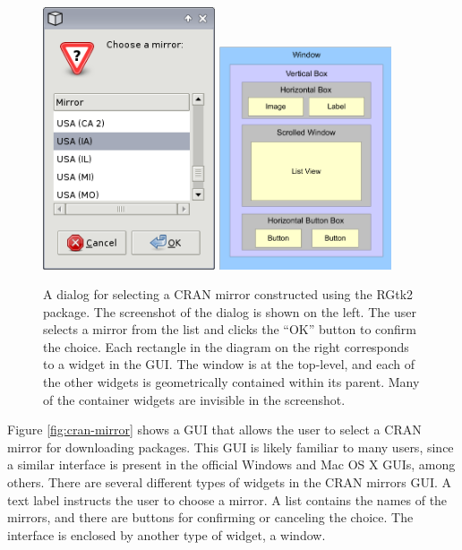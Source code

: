 \documentclass[article]{jss}
\begin{document}
\begin{figure}[bhp]
\begin{center}
\includegraphics[width=2in]{cran-mirror.png}
\includegraphics[width=2in]{widget-hierarchy.pdf}
\caption{\label{fig:cran-mirror}\label{fig:widget-hierarchy} 
A dialog for selecting a CRAN mirror constructed
using the RGtk2 package. The screenshot of the dialog is shown on the
left. The user selects a mirror from the list and clicks the
``OK'' button to confirm the choice.
Each rectangle in the diagram on the right corresponds to a widget in
the GUI. The window is at the top-level,
and each of the other widgets is geometrically contained within its
parent. Many of the container widgets are invisible in the
screenshot.}
\end{center}
\end{figure}

Figure \ref{fig:cran-mirror} shows a  GUI that allows the
user to
select a CRAN mirror for downloading  packages.
This GUI is likely familiar to many  users, since a
similar interface
is present in the official Windows and Mac OS X  GUIs,
among others.
There are several different types of widgets in the CRAN mirrors GUI.
A
text label instructs the user to choose a mirror.  A list contains the 
names of the mirrors, and there are buttons for confirming or
canceling the choice. 
The interface is enclosed by another type of widget, a window. 
\end{document}
